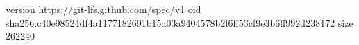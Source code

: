version https://git-lfs.github.com/spec/v1
oid sha256:c40e98524df4a1177182691b15a03a9404578b2f6ff53cf9e3b6ff992d238172
size 262240
